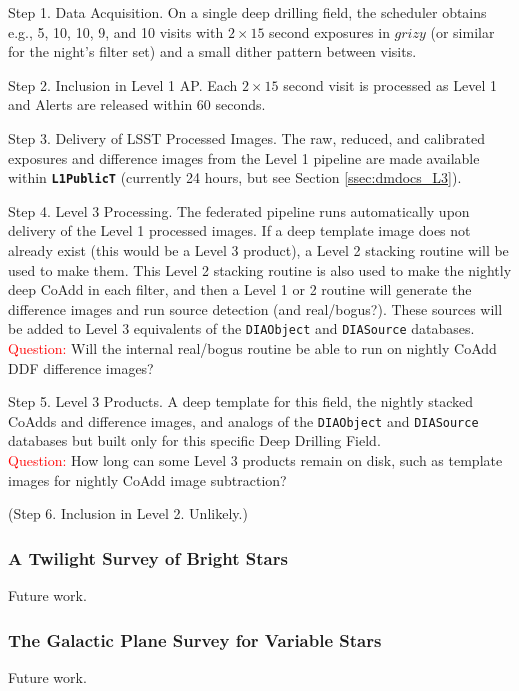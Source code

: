 \documentclass[DM,lsstdraft,toc]{lsstdoc}
\begin{document}
Step 1. Data Acquisition. On a single deep drilling field, the scheduler obtains e.g., 5, 10, 10, 9, and 10 visits with $2\times15$ second exposures in $grizy$ (or similar for the night's filter set) and a small dither pattern between visits.

Step 2. Inclusion in Level 1 AP. Each $2\times15$ second visit is processed as Level 1 and Alerts are released within 60 seconds.

Step 3. Delivery of LSST Processed Images. The raw, reduced, and calibrated exposures and difference images from the Level 1 pipeline are made available within {\tt \textbf{L1PublicT}} (currently 24 hours, but see Section \ref{ssec:dmdocs_L3}).

Step 4. Level 3 Processing. The federated pipeline runs automatically upon delivery of the Level 1 processed images. If a deep template image does not already exist (this would be a Level 3 product), a Level 2 stacking routine will be used to make them. This Level 2 stacking routine is also used to make the nightly deep CoAdd in each filter, and then a Level 1 or 2 routine will generate the difference images and run source detection (and real/bogus?). These sources will be added to Level 3 equivalents of the {\tt DIAObject} and {\tt DIASource} databases. 
\textcolor{red}{Question:} Will the internal real/bogus routine be able to run on nightly CoAdd DDF difference images?

Step 5. Level 3 Products. A deep template for this field, the nightly stacked CoAdds and difference images, and analogs of the {\tt DIAObject} and {\tt DIASource} databases but built only for this specific Deep Drilling Field. \\
\textcolor{red}{Question:} How long can some Level 3 products remain on disk, such as template images for nightly CoAdd image subtraction?

(Step 6. Inclusion in Level 2. Unlikely.)

\subsubsection{A Twilight Survey of Bright Stars}

Future work.

\subsubsection{The Galactic Plane Survey for Variable Stars}

Future work.
\end{document}
